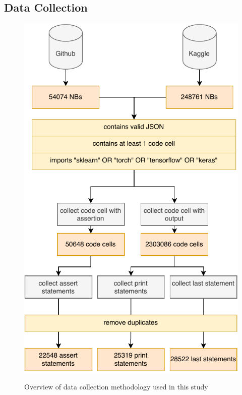 \subsection{Data Collection}\label{sec:data-collect}


\begin{figure}
\centering
\includegraphics[width=\linewidth]{data-collection.pdf}
\label{fig:data-collection}
\caption{Overview of data collection methodology used in this study}
\end{figure}

